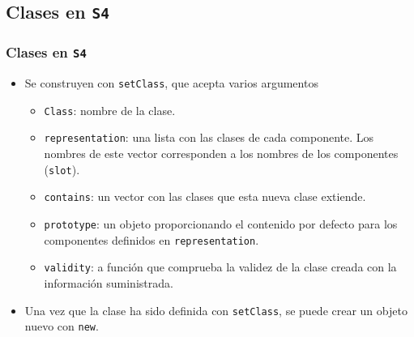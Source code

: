 \documentclass[xcolor={usenames,svgnames,dvipsnames}]{beamer}
\begin{document}
\subsection{Clases en \texttt{S4}}
\label{sec-3-1}
\begin{frame}
\frametitle{Clases en \texttt{S4}}
\label{sec-3-1-1}

\begin{itemize}
\item Se construyen con \texttt{setClass}, que acepta varios argumentos
\begin{itemize}
\item \texttt{Class}: nombre de la clase.
\item \texttt{representation}: una lista con las clases de cada componente. Los nombres de este vector corresponden a los nombres de los componentes (\texttt{slot}).
\item \texttt{contains}: un vector con las clases que esta nueva clase extiende.
\item \texttt{prototype}: un objeto proporcionando el contenido por defecto para los componentes definidos en \texttt{representation}.
\item \texttt{validity}: a función que comprueba la validez de la clase creada con la información suministrada.
\end{itemize}
\item Una vez que la clase ha sido definida con \texttt{setClass}, se puede crear
  un objeto nuevo con \texttt{new}.
\end{itemize}
\end{frame}
\end{document}
